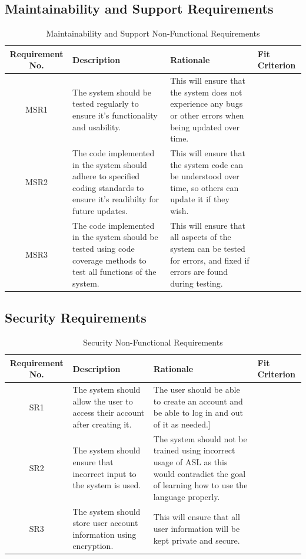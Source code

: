 \documentclass[12pt, titlepage]{article}
\begin{document}
\subsection{Maintainability and Support Requirements}

\begin{table}[H]
\caption{Maintainability and Support Non-Functional Requirements}
\noindent \begin{tabular}{| c | p{3cm}| p{3cm}| p{3cm}|}
\hline 
\textbf{Requirement No.} & \textbf{Description} & \textbf{Rationale} & \textbf{Fit Criterion}\\
\hline
MSR1 & The system should be tested regularly to ensure it's functionality and usability. & This will ensure that the system does not experience any bugs or other errors when being updated over time. & \\
\hline
MSR2 & The code implemented in the system should adhere to specified coding standards to ensure it's readibilty for future updates. & This will ensure that the system code can be understood over time, so others can update it if they wish. & \\
\hline
MSR3 & The code implemented in the system should be tested using code coverage methods to test all functions of the system. & This will ensure that all aspects of the system can be tested for errors, and fixed if errors are found during testing. & \\
\bottomrule
\end{tabular}
\end{table}

\subsection{Security Requirements}

\begin{table}[H]
\caption{Security Non-Functional Requirements}
\noindent \begin{tabular}{| c | p{3cm}| p{3cm}| p{3cm}|}
\hline 
\textbf{Requirement No.} & \textbf{Description} & \textbf{Rationale} & \textbf{Fit Criterion}\\
\hline
SR1 & The system should allow the user to access their account after creating it. & The user should be able to create an account and be able to log in and out of it as needed.] & \\
\hline
SR2 & The system should ensure that incorrect input to the system is used. & The system should not be trained using incorrect usage of ASL as this would contradict the goal of learning how to use the language properly. & \\
\hline
SR3 & The system should store user account information using encryption. & This will ensure that all user information will be kept private and secure. & \\
\bottomrule
\end{tabular}
\end{table}
\end{document}
